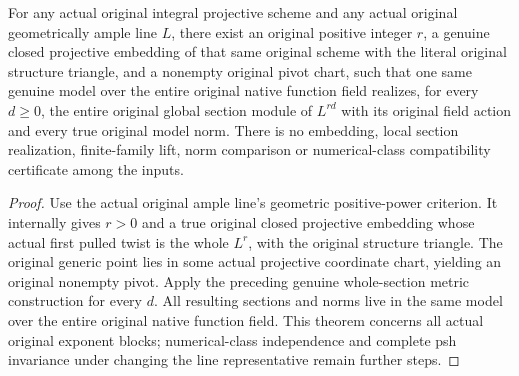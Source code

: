 \begin{theorem}
\label{thm:native-ample-model-section-blocks}
\leanok
{}
For any actual original integral projective scheme and any actual original
geometrically ample line $L$, there exist an original positive integer $r$,
a genuine closed projective embedding of that same original scheme with the
literal original structure triangle, and a nonempty original pivot chart,
such that one same genuine model over the entire original native function
field realizes, for every $d\ge0$, the entire original global section module
of $L^{rd}$ with its original field action and every true original model norm.
There is no embedding, local section realization, finite-family lift, norm
comparison or numerical-class compatibility certificate among the inputs.
\end{theorem}
\begin{proof}
Use the actual original ample line's geometric positive-power criterion.
It internally gives $r>0$ and a true original closed projective embedding
whose actual first pulled twist is the whole $L^r$, with the original
structure triangle. The original generic point lies in some actual
projective coordinate chart, yielding an original nonempty pivot. Apply
the preceding genuine whole-section metric construction for every $d$.
All resulting sections and norms live in the same model over the entire
original native function field. This theorem concerns all actual original
exponent blocks; numerical-class independence and complete psh invariance
under changing the line representative remain further steps.
\end{proof}
